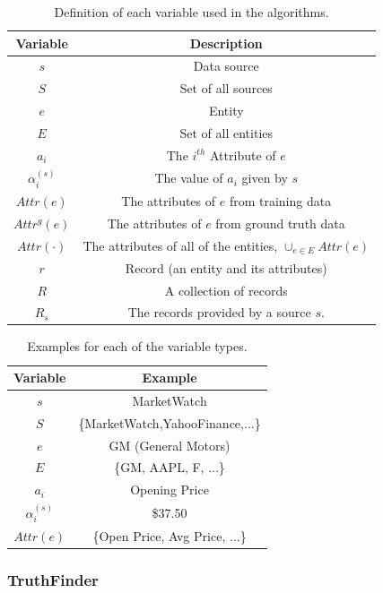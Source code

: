 \documentclass{acm_proc_article-sp}
\begin{document}
\begin{table}
\centering
\begin{tabular}{|c|c|}
\hline
Variable & Description  \\
\hline
$s$ & Data source \\
$S$ & Set of all sources  \\
$e$ & Entity \\
$E$ & Set of all entities \\
$a_i$ & The $i^{th}$ Attribute of $e$ \\
$\alpha_i^{(s)}$ & The value of $a_i$ given by $s$ \\
$Attr(e)$ & The attributes of $e$ from training data\\
$Attr^g(e)$ & The attributes of $e$ from ground truth data\\
$Attr(\cdot)$ & The attributes of all of the entities, $\cup_{e \in E} Attr(e)$ \\
$r$ & Record (an entity and its attributes) \\
$R$ & A collection of records \\
$R_s$ & The records provided by a source $s$. \\
\hline
\end{tabular}
\caption{Definition of each variable used in the algorithms.}
\label{tbl:vars}
\end{table}

\begin{table}
\centering
\begin{tabular}{|c|c|}
\hline
Variable & Example \\
\hline
$s$  & MarketWatch \\
$S$ & \{MarketWatch,YahooFinance,$\dots$\}  \\
$e$ & GM (General Motors) \\
$E$ & \{GM, AAPL, F, $\dots$\} \\
$a_i$ & Opening Price \\
$\alpha_i^{(s)}$ & \$37.50 \\
$Attr(e)$ & \{Open Price, Avg Price, $\dots$\} \\
\hline
\end{tabular}
\caption{Examples for each of the variable types.}
\label{tbl:varExs}
\end{table}

\subsubsection{TruthFinder}
\end{document}
